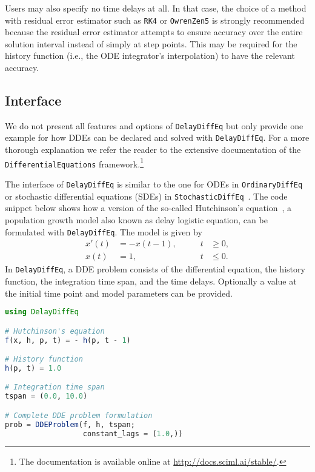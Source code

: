 \documentclass{juliacon}
\def\pkg#1{\texttt{#1}}
\def\alg#1{\texttt{#1}}
\begin{document}
Users may also specify no time delays at all. In that case, the choice of a method 
with residual error estimator such as \alg{RK4} or \alg{OwrenZen5} is strongly 
recommended because the residual error estimator attempts to ensure accuracy over the
entire solution interval instead of simply at step points. This may be required for
the history function (i.e., the ODE integrator's interpolation) to have the relevant
accuracy.

\subsection{Interface}

We do not present all features and options of \pkg{DelayDiffEq} but only provide one
example for how DDEs can be declared and solved with \pkg{DelayDiffEq}. For a more
thorough explanation we refer the reader to the extensive documentation of the
\pkg{DifferentialEquations} framework.\footnote{The documentation is available
online at \url{http://docs.sciml.ai/stable/}.}

The interface of \pkg{DelayDiffEq} is similar to the one for ODEs in \pkg{OrdinaryDiffEq}
or stochastic differential equations (SDEs) in \pkg{StochasticDiffEq}~\cite{rackauckas2017adaptive}.
The code snippet below shows how a version of the so-called Hutchinson's
equation~\cite{hutchinson48_circul_causal_system_in_ecolog},
a population growth model also known as delay logistic equation, can be formulated
with \pkg{DelayDiffEq}. The model is given by
\begin{equation}\label{eq:hutchinson}
    \begin{aligned}
        x'(t) &= - x(t - 1),& \qquad t &\geq 0, \\
        x(t) &= 1,& \qquad t &\leq 0.
    \end{aligned}
\end{equation}
In \pkg{DelayDiffEq}, a DDE problem consists of the differential equation, the history function,
the integration time span, and the time delays. Optionally a value at the initial time
point and model parameters can be provided.

\begin{lstlisting}[language = Julia]
using DelayDiffEq

# Hutchinson's equation
f(x, h, p, t) = - h(p, t - 1)

# History function
h(p, t) = 1.0

# Integration time span
tspan = (0.0, 10.0)

# Complete DDE problem formulation
prob = DDEProblem(f, h, tspan;
                  constant_lags = (1.0,))
\end{lstlisting}
\end{document}
